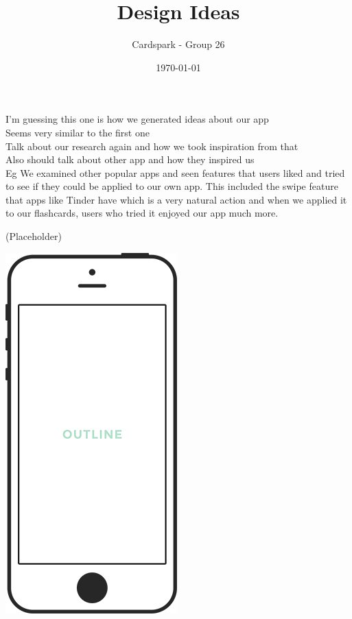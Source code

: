 \documentclass{article}
\begin{document}
\title{Design Ideas}
\author{Cardspark - Group 26}
\date{\today}
\maketitle

I'm guessing this one is how we generated ideas about our app\\
Seems very similar to the first one\\
Talk about our research again and how we took inspiration from that\\
Also should talk about other app and how they inspired us\\

Eg
We examined other popular apps and seen features that users liked and tried to see if they could be applied to our own app. This included the swipe feature that apps like Tinder have which is a very natural action and when we applied it to our flashcards, users who tried it enjoyed our app much more. 


(Placeholder)
\begin{center}
	\vspace{1mm}
	\includegraphics[scale=0.2]{placeholder.png}
	\vspace{1mm}
\end{center}
\end{document}
